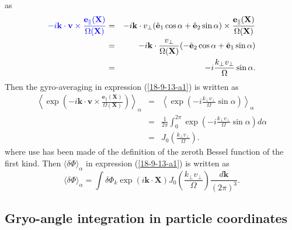 \documentclass{llncs}
\newcommand{\tmcolor}[2]{{\color{#1}{#2}}}
\begin{document}
as
\begin{eqnarray}
  \tmcolor{blue}{- i\mathbf{k} \cdot \mathbf{v} \times
  \frac{\mathbf{e}_{\parallel} (\mathbf{X})}{\Omega (\mathbf{X})}} & = & -
  i\mathbf{k} \cdot v_{\perp} (\hat{\mathbf{e}}_1 \cos \alpha +
  \hat{\mathbf{e}}_2 \sin \alpha) \times \frac{\mathbf{e}_{\parallel}
  (\mathbf{X})}{\Omega (\mathbf{X})} \nonumber\\
  & = & - i\mathbf{k} \cdot \frac{v_{\perp}}{\Omega (\mathbf{X})} (-
  \hat{\mathbf{e}}_2 \cos \alpha + \hat{\mathbf{e}}_1 \sin \alpha) \nonumber\\
  & = & - i \frac{k_{\perp} v_{\perp}}{\Omega} \sin \alpha . 
  \label{18-9-12-e6}
\end{eqnarray}
Then the gyro-averaging in expression (\ref{18-9-13-a1}) is written as
\begin{eqnarray}
  \left\langle \exp \left( - i\mathbf{k} \cdot \mathbf{v} \times
  \frac{\mathbf{e}_{\parallel} (\mathbf{X})}{\Omega (\mathbf{X})} \right)
  \right\rangle_{\alpha} & = & \left\langle \exp \left( - i \frac{k_{\perp}
  v_{\perp}}{\Omega} \sin \alpha \right) \right\rangle_{\alpha} \nonumber\\
  & = & \frac{1}{2 \pi} \int_0^{2 \pi} \exp \left( - i \frac{k_{\perp}
  v_{\perp}}{\Omega} \sin \alpha \right) d \alpha \nonumber\\
  & = & J_0 \left( \frac{k_{\perp} v_{\perp}}{\Omega} \right) . 
\end{eqnarray}
where use has been made of the definition of the zeroth Bessel function of the
first kind. Then $\langle \delta \Phi \rangle_{\alpha}$ in expression
(\ref{18-9-13-a1}) is written as
\begin{equation}
  \label{18-9-12-e1} \langle \delta \Phi \rangle_{\alpha} = \int \delta \Phi_k
  \exp (i\mathbf{k} \cdot \mathbf{X}) J_0 \left( \frac{k_{\perp}
  v_{\perp}}{\Omega} \right) \frac{d\mathbf{k}}{(2 \pi)^3} .
\end{equation}

\subsection{Gryo-angle integration in particle coordinates}
\end{document}
